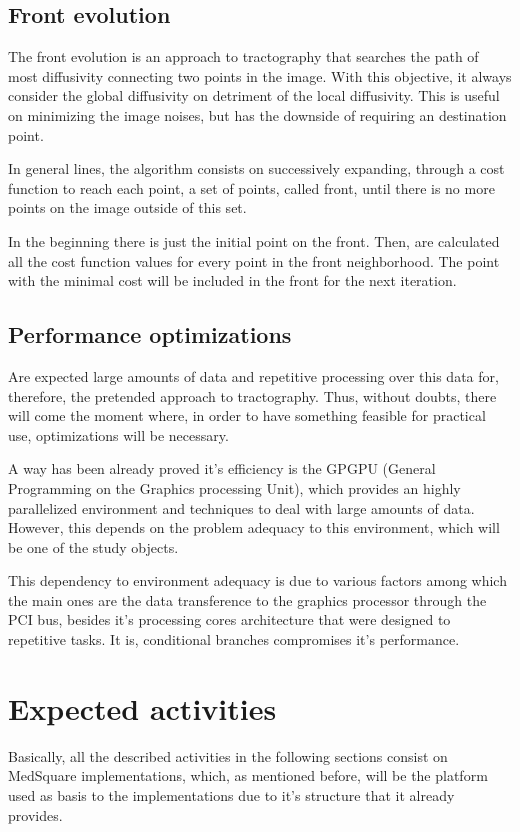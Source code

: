 \documentclass[a4paper,11pt]{report}
\begin{document}
  \section{Front evolution}
  The front evolution is an approach to tractography that searches the path of most diffusivity connecting two points in the image. With this objective, it always consider the global diffusivity on detriment of the local diffusivity. This is useful on minimizing the image noises, but has the downside of requiring an destination point.

  In general lines, the algorithm consists on successively expanding, through a cost function to reach each point, a set of points, called front, until there is no more points on the image outside of this set.

  In the beginning there is just the initial point on the front. Then, are calculated all the cost function values for every point in the front neighborhood. The point with the minimal cost will be included in the front for the next iteration.

  \section{Performance optimizations}
  Are expected large amounts of data and repetitive processing over this data for, therefore, the pretended approach to tractography. Thus, without doubts, there will come the moment where, in order to have something feasible for practical use, optimizations will be necessary.

  A way has been already proved it's efficiency is the GPGPU (General Programming on the Graphics processing Unit), which provides an highly parallelized environment and techniques to deal with large amounts of data. However, this depends on the problem adequacy to this environment, which will be one of the study objects.

  This dependency to environment adequacy is due to various factors among which the main ones are the data transference to the graphics processor through the PCI bus, besides it's processing cores architecture that were designed to repetitive tasks. It is, conditional branches compromises it's performance.

\chapter{Expected activities}
Basically, all the described activities in the following sections consist on MedSquare implementations, which, as mentioned before, will be the platform used as basis to the implementations due to it's structure that it already provides.
\end{document}
